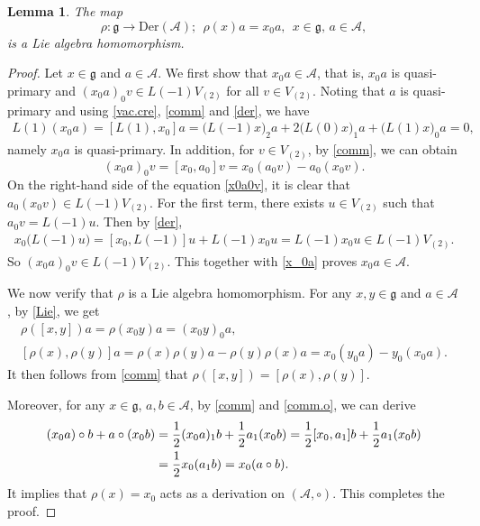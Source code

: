 \documentclass[12pt]{article}
\numberwithin{equation}{section}
\newtheorem{lemma}[theorem]{Lemma}
\theoremstyle{definition}
\theoremstyle{plain}
\newcommand{\fg}{\mathfrak{g}}
\newcommand{\Der}{\mathrm{Der }}
\newcommand{\cA}{\ensuremath{\mathcal{A}}}
\begin{document}
\begin{lemma}\label{lem:g-mod.A}
    The map
    \begin{equation*}
        \rho: \fg\rightarrow \Der(\cA);\ \ \rho(x)a=x_0a,\ \ x\in\fg,\,a\in \cA,
    \end{equation*}
    is a Lie algebra homomorphism.
\end{lemma}
\begin{proof}
    Let $x\in\fg$ and $a\in\cA$. We first show that $x_0a\in \cA$, that is, $x_0a$ is quasi-primary and $(x_0a)_0v\in L(-1)V_{(2)}$ for all $v\in V_{(2)}$. Noting that $a$ is quasi-primary and using \eqref{vac.cre}, \eqref{comm} and \eqref{der}, we have
    \begin{align}\label{x_0a}
        L(1)(x_0a)=[L(1),x_0]a=\big(L(-1)x\big)_2a+2\big(L(0)x\big)_1a+\big(L(1)x\big)_0a=0,
    \end{align}
    namely $x_0a$ is quasi-primary. In addition, for $v\in V_{(2)}$, by \eqref{comm}, we can obtain
    \begin{equation}\label{x0a0v}
        (x_0a)_0v=[x_0,a_0]v=x_0(a_0v)-a_0(x_0v).
    \end{equation}
    On the right-hand side of the equation \eqref{x0a0v}, it is clear that $a_0(x_0v)\in L(-1)V_{(2)}$. For the first term, there exists $u\in V_{(2)}$ such that $a_0v=L(-1)u$. Then by \eqref{der},
    \begin{align*}
        x_0\big(L(-1)u\big)=[x_0,L(-1)]u+L(-1)x_0u=L(-1)x_0u\in L(-1)V_{(2)}.
    \end{align*}
    So $(x_0a)_0v\in L(-1)V_{(2)}$. This together with \eqref{x_0a} proves $x_0a\in \cA$.

    We now verify that $\rho$ is a Lie algebra homomorphism. For any $x,y\in\fg$ and $a\in \cA$, by \eqref{Lie}, we get
    \begin{gather*}
        \rho([x,y])a=\rho(x_0y)a=(x_0y)_0a,\\
        [\rho(x),\rho(y)]a=\rho(x)\rho(y)a-\rho(y)\rho(x)a=x_0(y_0a)-y_0(x_0a).
    \end{gather*}
    It then follows from \eqref{comm} that $\rho([x,y])=[\rho(x),\rho(y)]$.

    Moreover, for any $x\in\fg$, $a,b\in \cA$, by \eqref{comm} and \eqref{comm.o}, we can derive 
    \begin{align}
        (x_0a)\circ b+a\circ(x_0b)&=\frac{1}{2}(x_0a)_1b+\frac{1}{2}a_1(x_0b)=\frac{1}{2}[x_0,a_1]b+\frac{1}{2}a_1(x_0b)\notag\\
        &=\frac{1}{2}x_0(a_1b)=x_0(a\circ b).\label{x_0.der}
    \end{align}
    It implies that $\rho(x)=x_0$ acts as a derivation on $(\cA,\circ)$. This completes the proof.
\end{proof}
\end{document}
